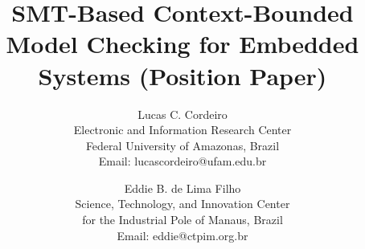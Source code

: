 \documentclass{acm_sen_article}
\begin{document}
%
\title{SMT-Based Context-Bounded Model Checking for Embedded Systems (Position Paper)}


\author{Lucas C. Cordeiro \\
Electronic and Information Research Center\\
Federal University of Amazonas, Brazil\\
Email: lucascordeiro@ufam.edu.br
\and
Eddie B. de Lima Filho \\
Science, Technology, and Innovation Center\\ for the Industrial Pole of Manaus, Brazil \\
Email: eddie@ctpim.org.br}


% 
\end{document}
